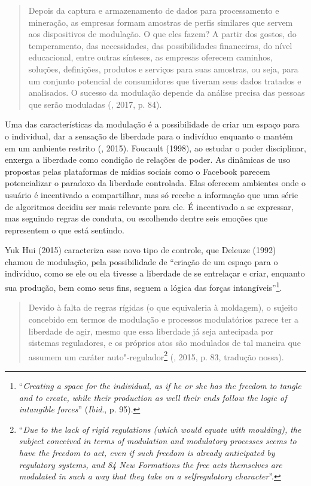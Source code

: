 \begin{quote}
Depois da captura e armazenamento de dados para processamento e
mineração, as empresas formam amostras de perfis similares que servem
aos dispositivos de modulação. O que eles fazem? A partir dos gostos, do
temperamento, das necessidades, das possibilidades financeiras, do nível
educacional, entre outras sínteses, as empresas oferecem caminhos,
soluções, definições, produtos e serviços para suas amostras, ou seja,
para um conjunto potencial de consumidores que tiveram seus dados
tratados e analisados. O sucesso da modulação depende da análise precisa
das pessoas que serão moduladas (, 2017, p. 84).
\end{quote}

Uma das características da modulação é a possibilidade de criar um
espaço para o individual, dar a sensação de liberdade para o indivíduo
enquanto o mantém em um ambiente restrito (, 2015).
Foucault (1998), ao estudar o poder disciplinar, enxerga a liberdade como condição de
relações de poder. As dinâmicas de uso propostas pelas plataformas de
mídias sociais como o Facebook parecem potencializar o paradoxo da
liberdade controlada. Elas oferecem ambientes onde o usuário é
incentivado a compartilhar, mas só recebe a informação que uma série de
algoritmos decidiu ser mais relevante para ele. É incentivado a se
expressar, mas seguindo regras de conduta, ou escolhendo dentre seis
emoções que representem o que está sentindo.

Yuk Hui (2015) caracteriza esse novo tipo de controle, que Deleuze
(1992) chamou de modulação, pela possibilidade de ``criação de um espaço
para o indivíduo, como se ele ou ela tivesse a liberdade de se
entrelaçar e criar, enquanto sua produção, bem como seus fins, seguem a
lógica das forças intangíveis''\footnote{``\emph{Creating a space for the
  individual, as if he or she has the freedom to tangle and to create,
  while their production as well their ends follow the logic of
  intangible forces}'' (\emph{Ibid}., p. 95).}.

\begin{quote}
Devido à falta de regras rígidas (o que equivaleria à moldagem), o
sujeito concebido em termos de modulação e processos modulatórios parece
ter a liberdade de agir, mesmo que essa liberdade já seja antecipada por
sistemas reguladores, e os próprios atos são modulados de tal maneira
que assumem um caráter auto"-regulador\footnote{``\emph{Due to the lack of
  rigid regulations (which would equate with moulding), the subject
  conceived in terms of modulation and modulatory processes seems to
  have the freedom to act, even if such freedom is already anticipated
  by regulatory systems, and 84 New Formations the free acts themselves
  are modulated in such a way that they take on a selfregulatory
  character}''.}
 (, 2015, p. 83, tradução nossa).
\end{quote}

